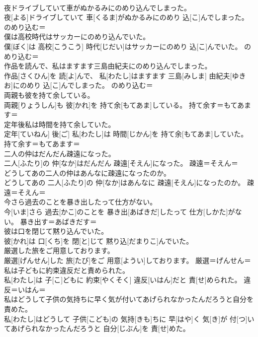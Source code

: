 \documentclass[8pt]{extreport}
\begin{document}
\begin{CJK}{UTF8}{min}
\\	夜ドライブしていて車がぬかるみにのめり込んでしまった。	
\\	夜[よる]ドライブしていて 車[くるま]がぬかるみにのめり 込[こ]んでしまった。	のめり込む＝ 
\\	僕は高校時代はサッカーにのめり込んでいた。	
\\	僕[ぼく]は 高校[こうこう] 時代[じだい]はサッカーにのめり 込[こ]んでいた。	のめり込む＝ 
\\	作品を読んで、私はますます三島由紀夫にのめり込んでしまった。	
\\	作品[さくひん]を 読[よ]んで、 私[わたし]はますます 三島[みしま] 由紀夫[ゆきお]にのめり 込[こ]んでしまった。	のめり込む＝ 
\\	両親も彼を持て余している。	
\\	両親[りょうしん]も 彼[かれ]を 持て余[もてあま]している。	持て余す＝もてあます＝ 
\\	定年後私は時間を持て余していた。	
\\	定年[ていねん] 後[ご] 私[わたし]は 時間[じかん]を 持て余[もてあま]していた。	持て余す＝もてあます＝ 
\\	二人の仲はだんだん疎遠になった。	
\\	二人[ふたり]の 仲[なか]はだんだん 疎遠[そえん]になった。	疎遠＝そえん＝ 
\\	どうしてあの二人の仲はあんなに疎遠になったのか。	
\\	どうしてあの 二人[ふたり]の 仲[なか]はあんなに 疎遠[そえん]になったのか。	疎遠＝そえん＝ 
\\	今さら過去のことを暴き出したって仕方がない。	
\\	今[いま]さら 過去[かこ]のことを 暴き出[あばきだ]したって 仕方[しかた]がない。	暴き出す＝あばきだす＝ 
\\	彼は口を閉じて黙り込んでいた。	
\\	彼[かれ]は 口[くち]を 閉[と]じて 黙り込[だまりこ]んでいた。	
\\	厳選した旅をご用意しております。	
\\	厳選[げんせん]した 旅[たび]をご 用意[ようい]しております。	厳選＝げんせん＝ 
\\	私は子どもに約束違反だと責められた。	
\\	私[わたし]は 子[こ]どもに 約束[やくそく] 違反[いはん]だと 責[せ]められた。	違反＝いはん＝ 
\\	私はどうして子供の気持ちに早く気が付いてあげられなかったんだろうと自分を責めた。	
\\	私[わたし]はどうして 子供[こども]の 気持[きも]ちに 早[はや]く 気[き]が 付[つ]いてあげられなかったんだろうと 自分[じぶん]を 責[せ]めた。	

\end{CJK}
\end{document}
